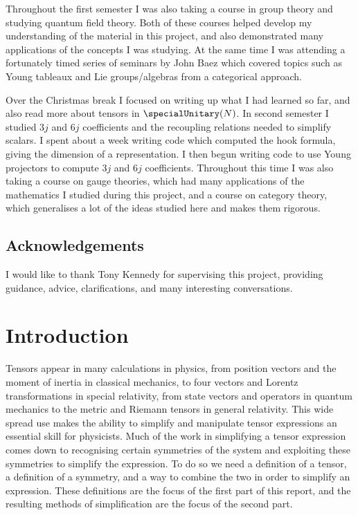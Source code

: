 \documentclass[fleqn]{NotesClass}
\begin{document}
    Throughout the first semester I was also taking a course in group theory and studying quantum field theory.
    Both of these courses helped develop my understanding of the material in this project, and also demonstrated many applications of the concepts I was studying.
    At the same time I was attending a fortunately timed series of seminars by John Baez \cite{baez} which covered topics such as Young tableaux and Lie groups/algebras from a categorical approach.
    
    Over the Christmas break I focused on writing up what I had learned so far, and also read more about tensors in \(\specialUnitary(N)\).
    In second semester I studied \(3j\) and \(6j\) coefficients and the recoupling relations needed to simplify scalars.
    I spent about a week writing code which computed the hook formula, giving the dimension of a representation.
    I then begun writing code to use Young projectors to compute \(3j\) and \(6j\) coefficients.
    Throughout this time I was also taking a course on gauge theories, which had many applications of the mathematics I studied during this project, and a course on category theory, which generalises a lot of the ideas studied here and makes them rigorous.
    \section{Acknowledgements}
    I would like to thank Tony Kennedy for supervising this project, providing guidance, advice, clarifications, and many interesting conversations.
    \mainmatter
    
    \chapter{Introduction}
    Tensors appear in many calculations in physics, from position vectors and the moment of inertia in classical mechanics, to four vectors and Lorentz transformations in special relativity, from state vectors and operators in quantum mechanics to the metric and Riemann tensors in general relativity.
    This wide spread use makes the ability to simplify and manipulate tensor expressions an essential skill for physicists.
    Much of the work in simplifying a tensor expression comes down to recognising certain symmetries of the system and exploiting these symmetries to simplify the expression.
    To do so we need a definition of a tensor, a definition of a symmetry, and a way to combine the two in order to simplify an expression.
    These definitions are the focus of the first part of this report, and the resulting methods of simplification are the focus of the second part.
    
\end{document}
